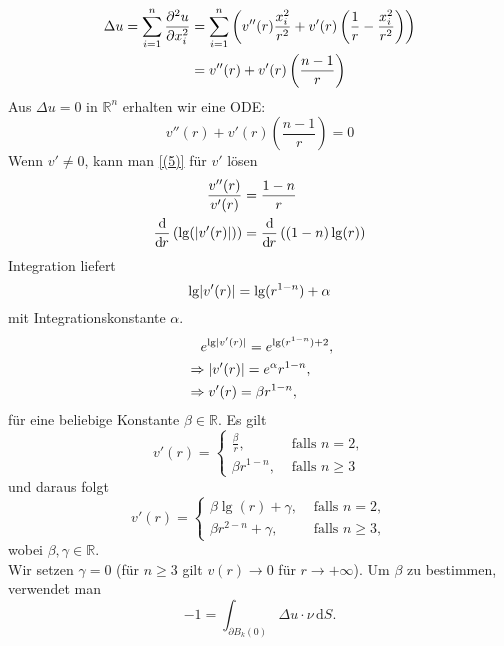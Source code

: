 \begin{align*}
	\Delta u = \sum^{n}_{i=1} \frac{{\partial ^2u}}{{\partial x_i^2}}  &= \sum^{n}_{i=1} \left( v''(r) \frac{x_i^2}{r^2} + v'(r) \left( \frac{1}{r} - \frac{x_i^2}{r^2} \right) \right) \\
	&= v''(r) + v'(r) \left( \frac{n-1}{r} \right)
\end{align*}
Aus $\Delta u = 0$ in $\mathbb{R}^n$ erhalten wir eine ODE:
\begin{equation}
	v''(r) + v'(r)\left( \frac{n-1}{r} \right) = 0  \label{(5)}
\end{equation}
Wenn $v' \neq 0$, kann man \eqref{(5)} für $v'$ lösen
\begin{align}
	\frac{v''(r)}{v'(r)} &= \frac{1-n}{r} \\
	\frac{\mathrm{d}\mkern-1.0mu }{\mathrm{d}\mkern-1.0mu r} \left( \lg(\lvert v'(r)\rvert) \right) &= \frac{\mathrm{d}\mkern-1.0mu }{\mathrm{d}\mkern-1.0mu r}  \left( (1-n) \lg(r) \right)
\end{align}
Integration liefert 
\begin{equation}
	\lg \lvert v'(r)\rvert = \lg( r ^{1-n}) + \alpha
\end{equation}
mit Integrationskonstante $\alpha$.
\begin{align*}
	&\hphantom{\Rightarrow} e^{\lg \lvert v'(r)\rvert} = e^{\lg(r^{1-n})+2}, \\
	&\Rightarrow \lvert v'(r)\rvert = e^{\alpha} r^{1-n}, \\
	&\Rightarrow v'(r) = \beta r^{1-n},
\end{align*}
für eine beliebige Konstante $\beta \in \mathbb{R}$. Es gilt
\begin{equation}
	v'(r) = \begin{cases}
		\frac{\beta}{r}, &\text{ falls } n = 2,\\
		\beta r^{1-n}, &\text{ falls } n \geq 3		
	\end{cases}
\end{equation}
und daraus folgt
\begin{equation}
	v'(r) = \begin{cases}
		\beta \lg(r)+ \gamma, &\text{ falls } n = 2,\\
		\beta r^{2-n} + \gamma , &\text{ falls } n \geq 3,		
	\end{cases}
\end{equation}
wobei $\beta,\gamma \in \mathbb{R}$. \\
Wir setzen $ \gamma = 0$ (für $n \geq 3$ gilt $v(r) \to 0$ für $r \to +\infty$). Um $\beta$ zu bestimmen, verwendet man 
\begin{equation}
	-1 = \int_{\partial B_k(0)}^{} \Delta u \cdot \nu \,\mathrm{d}S. \label{(6)}
\end{equation}
